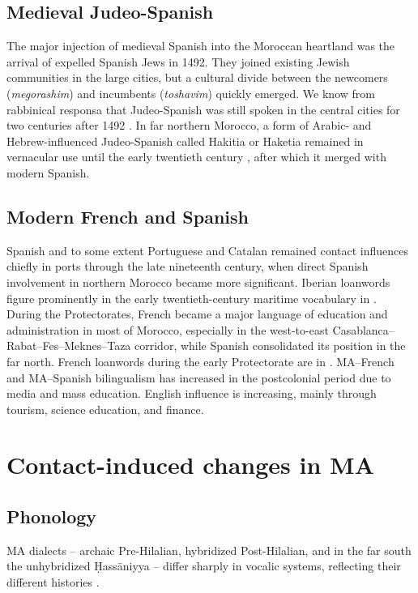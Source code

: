\documentclass[output=paper]{langsci/langscibook}
\begin{document}
\subsection{Medieval Judeo-Spanish}

The major injection of medieval Spanish into the Moroccan heartland was the arrival of expelled Spanish Jews in 1492. They joined existing Jewish communities in the large cities, but a cultural divide between the newcomers (\textit{megorashim}) and incumbents (\textit{toshavim}) quickly emerged. We know from rabbinical responsa that Judeo-Spanish was still spoken in the central cities for two centuries after 1492 \citep{Chetrit1985}. In far northern Morocco, a form of Arabic- and Hebrew-influenced Judeo-Spanish called Hakitia or Haketia remained in vernacular use until the early twentieth century \citep{Benoliel1977}, after which it merged with modern Spanish.

\subsection{Modern French and Spanish}

Spanish and to some extent Portuguese and Catalan remained contact influences chiefly in ports through the late nineteenth century, when direct Spanish involvement in northern Morocco became more significant. Iberian loanwords figure prominently in the early twentieth-century maritime vocabulary in \citet{Brunot1920}. During the Protectorates, French became a major language of education and administration in most of Morocco, especially in the west-to-east Casablanca–Rabat–Fes–Meknes–Taza corridor, while Spanish consolidated its position in the far north. French loanwords during the early Protectorate are in \citet{Brunot1949}. MA–French and MA–Spanish bilingualism has increased in the postcolonial period due to media and mass education. English influence is increasing, mainly through tourism, science education, and finance.

\section{Contact-induced changes in MA}

\subsection{Phonology}

MA dialects – archaic Pre-Hilalian, hybridized Post-Hilalian, and in the far south the unhybridized Ḥassāniyya – differ sharply in vocalic systems, reflecting their different histories \citep{Heath2018}.
\end{document}
